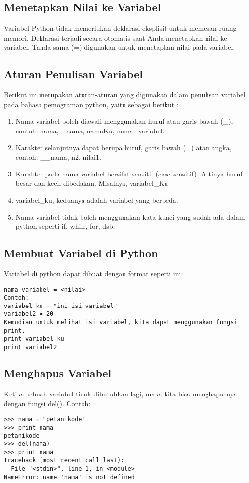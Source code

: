 \subsection{Menetapkan Nilai ke Variabel}
Variabel Python tidak memerlukan deklarasi eksplisit untuk memesan ruang memori. Deklarasi terjadi secara otomatis saat Anda menetapkan nilai ke variabel. Tanda sama (=) digunakan untuk menetapkan nilai pada variabel.

\subsection{Aturan Penulisan Variabel}
Berikut ini merupakan aturan-aturan yang digunakan dalam penulisan variabel pada bahasa pemograman python, yaitu sebagai berikut :
\begin{enumerate}
	\item Nama variabel boleh diawali menggunakan huruf atau garis bawah (_), contoh: nama, _nama, namaKu, nama_variabel.
	\item Karakter selanjutnya dapat berupa huruf, garis bawah (_) atau angka, contoh: __nama, n2, nilai1.
	\item Karakter pada nama variabel bersifat sensitif (case-sensitif). Artinya huruf besar dan kecil dibedakan. Misalnya, variabel_Ku
	\item variabel_ku, keduanya adalah variabel yang berbeda.
	\item Nama variabel tidak boleh menggunakan kata kunci yang sudah ada dalam python seperti if, while, for, dsb.
\end{enumerate}  

\subsection{Membuat Variabel di Python}
Variabel di python dapat dibuat dengan format seperti ini:
\begin{verbatim}
nama_variabel = <nilai>
Contoh:
variabel_ku = "ini isi variabel"
variabel2 = 20
Kemudian untuk melihat isi variabel, kita dapat menggunakan fungsi print.
print variabel_ku
print variabel2
\end{verbatim}

\subsection{Menghapus Variabel}
Ketika sebuah variabel tidak dibutuhkan lagi, maka kita bisa menghapusnya dengan fungsi del().
Contoh:
\begin{verbatim}
>>> nama = "petanikode"
>>> print nama
petanikode
>>> del(nama)
>>> print nama
Traceback (most recent call last):
  File "<stdin>", line 1, in <module>
NameError: name 'nama' is not defined
\end{verbatim}
